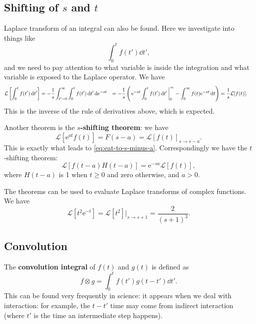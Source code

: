 \documentclass[hyperref, a4paper]{article}
\newcommand*{\ee}{\mathrm{e}}
\newcommand*{\concept}[1]{{\textbf{#1}}}
\def\\{}%
\newcommand*{\laplace}{\mathcal{L}}
\newcommand*{\zerotoinf}{\int_{0}^{\infty}}
\begin{document}
\subsection{Shifting of $s$ and $t$}

Laplace transform of an integral can also be found. 
Here we investigate into things like 
\[
    \int_0^t f(t') \dd{t'},
\]
and we need to pay attention to what variable is inside the integration 
and what variable is exposed to the Laplace operator. 
We have 
\begin{equation}
    \begin{aligned}
        \laplace\left[
            \int_{0}^{t} f(t') \dd{t'}
        \right] &= - \frac{1}{s} \int_{t'=0}^{\infty} \int_{0}^{t} f(t') \dd{t'} \dd \ee^{-st} \\
        &= - \frac{1}{s} \left(
            \eval{\ee^{-st} \int_{0}^{t} f(t') \dd{t'}}_{0}^{\infty} - 
            \zerotoinf f(t) \ee^{-st} \dd{t} 
        \right) \\
        &= \frac{1}{s} \laplace[f(t)].
    \end{aligned}
\end{equation}
This is the inverse of the rule of derivatives above, 
which is expected. 

Another theorem is the \concept{$s$-shifting theorem}: 
we have 
\begin{equation}
    \laplace[\ee^{at} f(t)] = F(s-a) = \laplace[f(t)]_{s \to s - a}.
\end{equation}
This is exactly what leads to \eqref{eq:eat-to-s-minus-a}.
Correspondingly we have the $t$-shifting theorem: 
\begin{equation}
    \laplace[f(t-a) H(t-a)] = \ee^{-sa} \laplace[f(t)], 
\end{equation}
where $H(t-a)$ is 1 when $t \geq 0$ and zero otherwise,
and $a > 0$. 

The theorems can be used to evaluate Laplace transforms of complex functions. 
We have 
\begin{equation}
    \laplace[t^2 \ee^{-t}] = \laplace[t^2] |_{s \to s + 1}
    = \frac{2}{(s+1)^3}.
\end{equation}

\subsection{Convolution}

The \concept{convolution integral} of $f(t)$ and $g(t)$ is defined as 
\begin{equation}
    f \otimes g = \int_0^t f(t') g(t-t') \dd{t'}.
\end{equation}
This can be found very frequently in science: 
it appears when we deal with interaction:
for example, the $t - t'$ time may come from indirect interaction 
(where $t'$ is the time an intermediate step happens).
\end{document}
